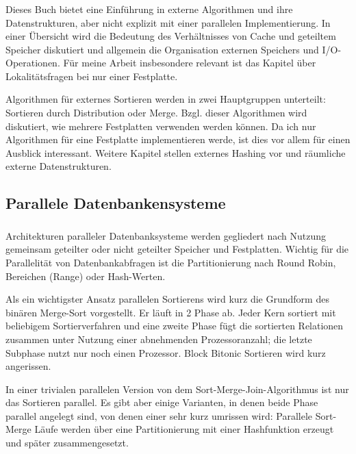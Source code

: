 \documentclass[a4paper,12pt,twoside]{article}
\begin{document}
\subsubsection*{}

Dieses Buch bietet eine Einführung in externe Algorithmen und ihre Datenstrukturen, aber nicht explizit mit einer parallelen Implementierung. In einer Übersicht wird die Bedeutung des Verhältnisses von Cache und geteiltem Speicher diskutiert und allgemein die Organisation externen Speichers und I/O-Operationen. Für meine Arbeit insbesondere relevant ist das Kapitel über Lokalitätsfragen bei nur einer Festplatte. 

Algorithmen für externes Sortieren werden in zwei Hauptgruppen unterteilt: Sortieren durch Distribution oder Merge. Bzgl. dieser Algorithmen wird diskutiert, wie mehrere Festplatten verwenden werden können. Da ich nur Algorithmen für eine Festplatte implementieren werde, ist dies vor allem für einen Ausblick interessant. Weitere Kapitel stellen externes Hashing vor und räumliche externe Datenstrukturen.

\subsection{Parallele Datenbankensysteme}

\subsubsection*{}

Architekturen paralleler Datenbanksysteme werden gegliedert nach Nutzung gemeinsam geteilter oder nicht geteilter Speicher und Festplatten. Wichtig für die Parallelität von Datenbankabfragen ist die Partitionierung nach Round Robin, Bereichen (Range) oder Hash-Werten.

Als ein wichtigster Ansatz parallelen Sortierens wird kurz die Grundform des binären Merge-Sort vorgestellt. Er läuft in 2 Phase ab. Jeder Kern sortiert mit beliebigem Sortierverfahren und eine zweite Phase fügt die sortierten Relationen zusammen unter Nutzung einer abnehmenden Prozessoranzahl; die letzte Subphase nutzt nur noch einen Prozessor. Block Bitonic Sortieren wird kurz angerissen. 

In einer trivialen parallelen Version von dem Sort-Merge-Join-Algorithmus ist nur das Sortieren parallel. Es gibt aber einige Varianten, in denen beide Phase parallel angelegt sind, von denen einer sehr kurz umrissen wird: Parallele Sort-Merge Läufe werden über eine Partitionierung mit einer Hashfunktion erzeugt und später zusammengesetzt.
\end{document}
